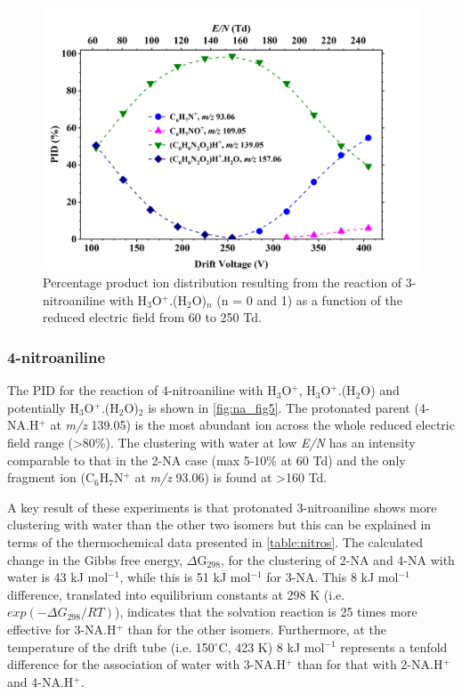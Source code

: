 \begin{figure}%
\centering
\includegraphics[height=0.35\textheight]{pics/nitros_paper_4.png}
\caption{Percentage product ion distribution resulting from the reaction of 3-nitroaniline with H$_3$O$^+$.(H$_2$O)$_n$ (n = 0 and 1) as a function of the reduced electric field from 60 to 250 Td.}
\label{fig:na_fig4}
\end{figure}

\subsubsection{4-nitroaniline}
The PID for the reaction of 4-nitroaniline with H$_3$O$^+$, H$_3$O$^+$.(H$_2$O) and potentially H$_3$O$^+$.(H$_2$O)$_2$ is shown in \autoref{fig:na_fig5}. 
The protonated parent (4-NA.H$^+$ at \textit{m/z} 139.05) is the most abundant ion across the whole reduced electric field range (>80\%).
The clustering with water at low \textit{E/N} has an intensity comparable to that in the 2-NA case (max 5-10\% at 60 Td) and the only fragment ion (C$_6$H$_7$N$^+$ at \textit{m/z} 93.06) is found at >160 Td.

A key result of these experiments is that protonated 3-nitroaniline shows more clustering with water than the other two isomers but this can be explained in terms of the thermochemical data presented in \autoref{table:nitros}.
The calculated change in the Gibbs free energy, $\Delta$G$_{298}$, for the clustering of 2-NA and 4-NA with water is 43 kJ mol$^{-1}$, while this is 51 kJ mol$^{-1}$ for 3-NA. 
This 8 kJ mol$^{-1}$ difference, translated into equilibrium constants  at 298 K (i.e. $exp(-\Delta G_{298}/RT)$), indicates that the solvation reaction is 25 times more effective for 3-NA.H$^+$ than for the other isomers. 
Furthermore, at the temperature of the drift tube (i.e. 150$^\circ$C, 423 K) 8 kJ mol$^{-1}$ represents a tenfold difference for the association of water with  3-NA.H$^+$ than for that with 2-NA.H$^+$ and 4-NA.H$^+$.


